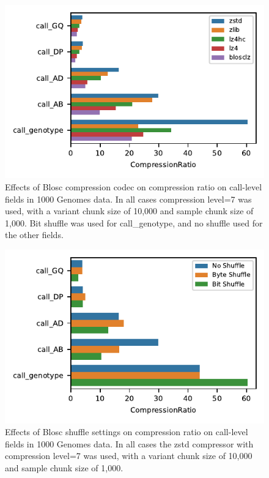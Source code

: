 \documentclass[a4paper,num-refs]{oup-contemporary}
\begin{document}
\begin{figure}[h]
\includegraphics{figures/compression-compressor}
\caption{Effects of Blosc compression codec on compression ratio on call-level 
fields in 1000 Genomes data. 
In all cases compression level=7 was used, with a variant
chunk size of 10,000 and sample chunk size of 1,000.
Bit shuffle was used for call\_genotype, and no shuffle used for the other fields.
\label{fig-compression-compressor}}
\end{figure}

\begin{figure}[h]
\includegraphics{figures/compression-shuffle}
\caption{Effects of Blosc shuffle settings on compression ratio on call-level 
fields in 1000 Genomes data. 
In all cases the zstd compressor with compression level=7 was used, with a variant
chunk size of 10,000 and sample chunk size of 1,000.
\label{fig-compression-shuffle}}
\end{figure}
\end{document}

